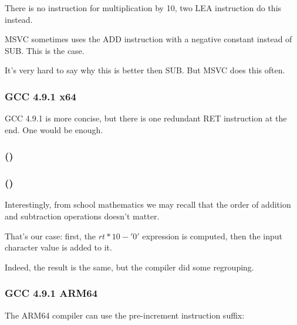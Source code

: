 There is no instruction for multiplication by 10, two LEA instruction do this instead.

MSVC sometimes uses the ADD instruction with a negative constant instead of SUB.
This is the case.

It's very hard to say why this is better then SUB.
But MSVC does this often.

\subsubsection{\Optimizing GCC 4.9.1 x64}

\Optimizing GCC 4.9.1 is more concise, but there is one redundant RET instruction at the end.
One would be enough.



\subsubsection{\OptimizingKeilVI (\ARMMode)}



\subsubsection{\OptimizingKeilVI (\ThumbMode)}



Interestingly, from school mathematics we may recall that the order of addition and 
subtraction operations doesn't matter.

That's our case: first, the $rt*10 - '0'$ expression is computed, then the input character value 
is added to it.

Indeed, the result is the same, but the compiler did some regrouping.

\subsubsection{\Optimizing GCC 4.9.1 ARM64}

The ARM64 compiler can use the pre-increment instruction suffix:



